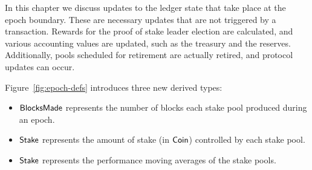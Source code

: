 \newcommand{\UTxOEpState}{\type{UTxOEpState}}
\newcommand{\Acnt}{\type{Acnt}}
\newcommand{\AcntEnv}{\type{AcntEnv}}
\newcommand{\AcntState}{\type{AcntState}}
\newcommand{\PlReapState}{\type{PlReapState}}
\newcommand{\NewPParamEnv}{\type{NewPParamEnv}}
\newcommand{\NewPParamState}{\type{NewPParamState}}
\newcommand{\EpochEnv}{\type{EpochEnv}}
\newcommand{\EpochState}{\type{EpochState}}
\newcommand{\BlocksMade}{\type{BlocksMade}}
\newcommand{\Stake}{\type{Stake}}
\newcommand{\Avgs}{\type{Avgs}}

\newcommand{\obligation}[4]{\fun{obligation}~ \var{#1}~ \var{#2}~ \var{#3}~ \var{#4}}
\newcommand{\reward}[5]{\fun{reward}~ \var{#1}~ \var{#2}~ \var{#3}~ \var{#4}~ \var{#5}}
\newcommand{\rewardOnePool}[9]{\fun{rewardOnePool}~\var{#1}~\var{#2}~\var{#3}~\var{#4}~\var{#5}~\var{#6}~\var{#7}~\var{#8}~\var{#9}}
\newcommand{\isActive}[4]{\fun{isActive}~ \var{#1}~ \var{#2}~ \var{#3}~ \var{#4}}
\newcommand{\activeStake}[5]{\fun{activeStake}~ \var{#1}~ \var{#2}~ \var{#3}~ \var{#4}~ \var{#5}}
\newcommand{\poolRefunds}[3]{\fun{poolRefunds}~ \var{#1}~ \var{#2}~ \var{#3}}
\newcommand{\poolStake}[4]{\fun{poolStake}~ \var{#1}~ \var{#2}~ \var{#3}~ \var{#4}}
\newcommand{\poolDistr}[3]{\fun{poolDistr}~ \var{#1}~ \var{#2}~ \var{#3}}
\newcommand{\lReward}[4]{\fun{r_{leader}}~ \var{#1}~ \var{#2}~ \var{#3}~ {#4}}
\newcommand{\mReward}[4]{\fun{r_{member}}~ \var{#1}~ \var{#2}~ \var{#3}~ {#4}}
\newcommand{\poolReward}[6]{\fun{poolReward}~\var{#1}~\var{#2}~\var{#3}~\var{#4}~\var{#5}~\var{#6}}
\newcommand{\movingAvg}[5]{\fun{movingAvg}~ \var{#1}~ \var{#2}~ \var{#3}~ \var{#4}~ \var{#5}}
\newcommand{\updateAvgs}[4]{\fun{updateAvgs}~ \var{#1}~ \var{#2}~ \var{#3}~ \var{#4}}

In this chapter we discuss updates to the ledger state that take place at the epoch boundary.
These are necessary updates that are not triggered by a transaction.
Rewards for the proof of stake leader election are calculated, and various accounting values
are updated, such as the treasury and the reserves.  Additionally, pools scheduled for retirement
are actually retired, and protocol updates can occur.

Figure~\ref{fig:epoch-defs} introduces three new derived types:
\begin{itemize}
  \item $\mathsf{BlocksMade}$ represents the number of blocks each stake pool produced
    during an epoch.
  \item $\mathsf{Stake}$ represents the amount of stake (in $\mathsf{Coin}$) controlled by each
    stake pool.
  \item $\mathsf{Stake}$ represents the performance moving averages of the stake pools.
\end{itemize}

